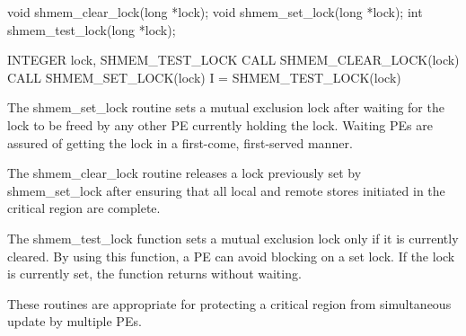 \synC
void shmem_clear_lock(long *lock);
void shmem_set_lock(long *lock);
int shmem_test_lock(long *lock);

\synF   %
INTEGER lock, SHMEM_TEST_LOCK
CALL SHMEM_CLEAR_LOCK(lock)
CALL SHMEM_SET_LOCK(lock)
I = SHMEM_TEST_LOCK(lock)

{
       The shmem\_set\_lock routine sets a mutual exclusion lock after  waiting
       for  the lock  to be freed by any other PE currently holding the lock.
       Waiting PEs  are  assured  of  getting	the  lock  in  a   first-come,
       first-served manner.

       The   shmem\_clear\_lock  routine releases  a  lock  previously  set  by
       shmem\_set\_lock  after  ensuring that  all  local  and  remote	stores
       initiated in the critical region are complete.

       The shmem\_test\_lock function sets a mutual exclusion lock only if it is
       currently cleared.  By using this function, a PE can avoid blocking  on
       a set lock.  If the lock is currently set, the function returns without
       waiting.

       These routines are appropriate for protecting a	critical  region  from
       simultaneous  update  by multiple  PEs.	  
}
{

}

\eAPI